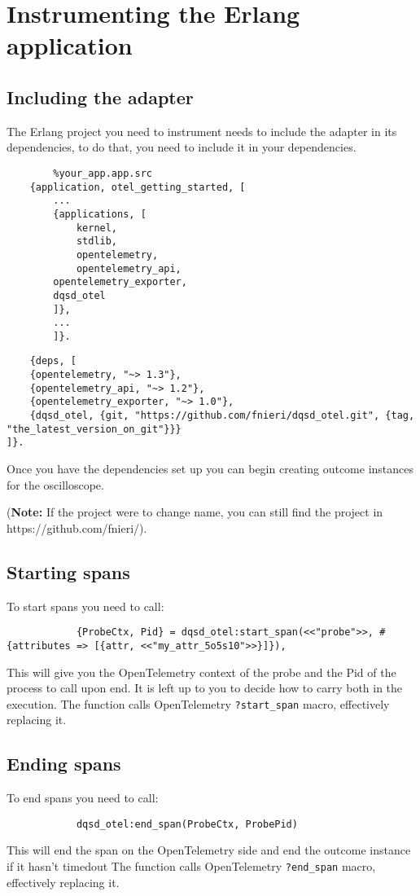 \section{Instrumenting the Erlang application}
    \subsection{Including the adapter}

    The Erlang project you need to instrument needs to include the adapter in its dependencies, to do that, you need to include it in your dependencies.

    \begin{verbatim}
        %your_app.app.src
    {application, otel_getting_started, [
        ...
        {applications, [
            kernel,
            stdlib,
            opentelemetry,
            opentelemetry_api,
        opentelemetry_exporter,
        dqsd_otel
        ]},
        ...
        ]}.
    \end{verbatim}

    \begin{verbatim}
    {deps, [
    {opentelemetry, "~> 1.3"},
    {opentelemetry_api, "~> 1.2"},
    {opentelemetry_exporter, "~> 1.0"},
    {dqsd_otel, {git, "https://github.com/fnieri/dqsd_otel.git", {tag, "the_latest_version_on_git"}}}
]}.
    \end{verbatim}
    
    Once you have the dependencies set up you can begin creating outcome instances for the oscilloscope.

    (\textbf{Note:} If the project were to change name, you can still find the project in https://github.com/fnieri/).

    \subsection{Starting spans}
        To start spans you need to call:
        \begin{verbatim}
            {ProbeCtx, Pid} = dqsd_otel:start_span(<<"probe">>, #{attributes => [{attr, <<"my_attr_5o5s10">>}]}),
        \end{verbatim}
        This will give you the OpenTelemetry context of the probe and the Pid of the process to call upon end. It is left up to you to decide how to carry both in the execution.
        The function calls OpenTelemetry \texttt{?start\_span} macro, effectively replacing it.

    \subsection{Ending spans}
        To end spans you need to call:
        \begin{verbatim}
            dqsd_otel:end_span(ProbeCtx, ProbePid)
        \end{verbatim}
        This will end the span on the OpenTelemetry side and end the outcome instance if it hasn't timedout
        The function calls OpenTelemetry \texttt{?end\_span} macro, effectively replacing it.

